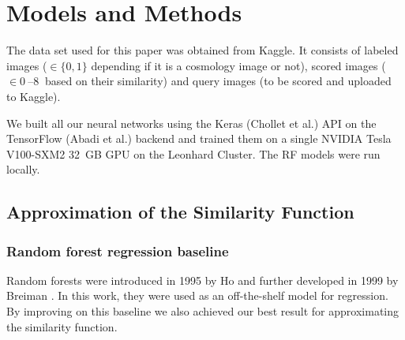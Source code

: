 \documentclass[10pt,conference,compsocconf]{IEEEtran}
\begin{document}


\section{Models and Methods} \label{sec:models_methods}
The data set used for this paper was obtained from Kaggle. It consists of labeled images ($\in \{0,1\}$ depending if it is a cosmology image or not), scored images ($\in \SIrange{0}{8}{}$ based on their similarity) and query images (to be scored and uploaded to Kaggle).

We built all our neural networks using the Keras (Chollet et al.\@ \cite{chollet2015keras}) API on the TensorFlow (Abadi et al.\@ \cite{tensorflow2015-whitepaper}) backend and trained them on a single NVIDIA Tesla V100-SXM2 \SI{32}{GB} GPU on the Leonhard Cluster. The RF models were run locally.

\subsection{Approximation of the Similarity Function}

\subsubsection{Random forest regression baseline} 
Random forests were introduced in 1995 by Ho \cite{Ho} and further developed in 1999 by Breiman \cite{Breiman}. In this work, they were used as an off-the-shelf model for regression. By improving on this baseline we also achieved our best result for approximating the similarity function. 
\end{document}

